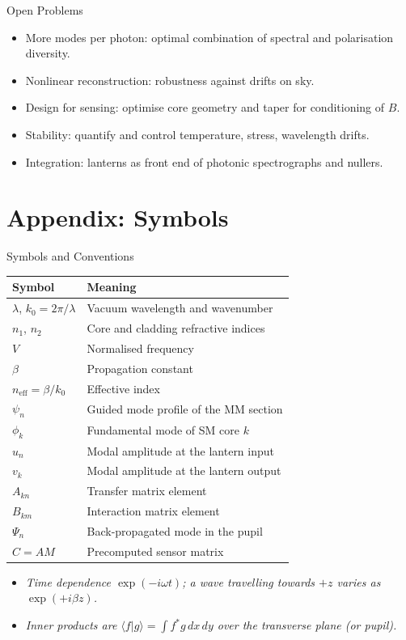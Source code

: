 \documentclass[aspectratio=169,10pt]{beamer}
\begin{document}
\begin{frame}{Open Problems}
\begin{itemize}
    \item More modes per photon: optimal combination of spectral and polarisation diversity.
    \item Nonlinear reconstruction: robustness against drifts on sky.
    \item Design for sensing: optimise core geometry and taper for conditioning of \(B\).
    \item Stability: quantify and control temperature, stress, wavelength drifts.
    \item Integration: lanterns as front end of photonic spectrographs and nullers.
\end{itemize}
\end{frame}

\section*{Appendix: Symbols}
\begin{frame}{Symbols and Conventions}
\begin{table}
\centering
\small
\begin{tabular}{@{}ll@{}}
\toprule
\textbf{Symbol} & \textbf{Meaning} \\
\midrule
\(\lambda\), \(k_0 = 2\pi/\lambda\) & Vacuum wavelength and wavenumber \\
\(n_1\), \(n_2\) & Core and cladding refractive indices \\
\(V\) & Normalised frequency \\
\(\beta\) & Propagation constant \\
\(n_{\mathrm{eff}} = \beta/k_0\) & Effective index \\
\(\psi_n\) & Guided mode profile of the MM section \\
\(\phi_k\) & Fundamental mode of SM core \(k\) \\
\(u_n\) & Modal amplitude at the lantern input \\
\(v_k\) & Modal amplitude at the lantern output \\
\(A_{kn}\) & Transfer matrix element \\
\(B_{km}\) & Interaction matrix element \\
\(\Psi_n\) & Back-propagated mode in the pupil \\
\(C = AM\) & Precomputed sensor matrix \\
\bottomrule
\end{tabular}
\end{table}
\begin{itemize}
    \item \emph{Time dependence \(\exp(-i\omega t)\); a wave travelling towards \(+z\) varies as \(\exp(+i\beta z)\).}
    \item \emph{Inner products are \(\langle f | g \rangle = \int f^* g\,dx\,dy\) over the transverse plane (or pupil).}
\end{itemize}
\end{frame}
\end{document}
